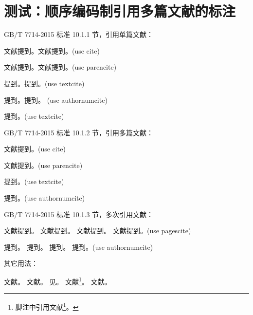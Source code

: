 \documentclass[twoside]{article}
\begin{document}
    \section{测试：顺序编码制引用多篇文献的标注}
    \begin{refsection}
     GB/T 7714-2015 标准 10.1.1 节，引用单篇文献：

    文献\cite{徐伟康2010对}提到。文献\cite{FOURNEY1971-17-38}提到。(use cite)\par
    文献\parencite{徐伟康2010对}提到。文献\parencite{FOURNEY1971-17-38}提到。(use parencite)\par
    \textcite{徐伟康2010对}提到。\textcite{FOURNEY1971-17-38}提到。(use textcite)\par
    提到。提到。
    (use authornumcite)\par
    \textcite{徐伟康2010对}提到。(use textcite)

\bigskip
    GB/T 7714-2015 标准 10.1.2 节，引用多篇文献：

    文献\cite{杨光2015经济波动,Yi2013--}提到。(use cite)\par
    文献\parencite{杨光2015经济波动,Yi2013--}提到。(use parencite)\par
    \textcite{杨光2015经济波动,Yi2013--}提到。(use textcite)\par
    提到。(use authornumcite)\par


\bigskip
    GB/T 7714-2015 标准 10.1.3 节，多次引用文献：

    文献提到。
    文献提到。
    文献提到。
    文献提到。(use pagescite)\par
    提到。
    提到。
    提到。
    提到。(use authornumcite)\par

\bigskip
    其它用法：

    文献\cite[见][49页]{杨光2015经济波动}。
    文献\parencite[见][49页]{杨光2015经济波动}。
    见\citeauthor{杨光2015经济波动}\cite{杨光2015经济波动}。
    文献\footnote{脚注中引用文献\footcite{杨光2015经济波动}。}。
    文献。


    \printbibliography
    \end{refsection}
\end{document}
